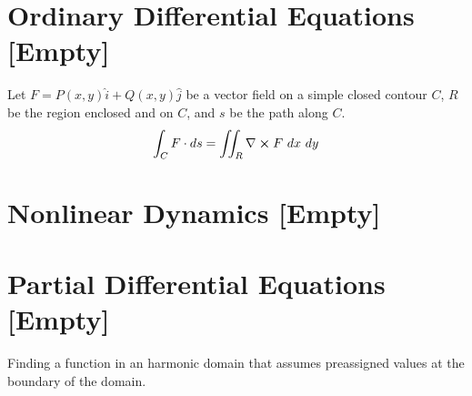 \documentclass[12pt, english]{book}
\begin{document}
	
	
	
	
	
	
	
	
	
	
	
	
	
	
	
	
	
	
	
	
	
	
	
	
	
	
	
	
	
	
	
	
	
	
	
	
	
	
	
	
	
	
	
	
	
	
	
	
	
	
	\part{Ordinary Differential Equations [Empty]} \label{Ordinary Differential Equations Part}
	
	\begin{theorem}
		\label{Green's Theorem - ODE}
		Let \(F = P(x,y) \hat{i} + Q(x,y) \hat{j}\) be a vector field on a simple closed contour \(C\), \(R\) be the region enclosed and on \(C\), and \(s\) be the path along \(C\).
		\begin{align*}
			\int_C F \cdot ds = \iint_R \nabla \cross F \ dx \ dy
		\end{align*}
	\end{theorem}
	
	\part{Nonlinear Dynamics [Empty]} \label{Nonlinear Dynamics Part}
	
	
	\part{Partial Differential Equations [Empty]} \label{Partial Differential Equations Part}
	
	\begin{definition}
		\label{Dirichlet Problem Definition - Partial}
		Finding a function in an harmonic domain that assumes preassigned values at the boundary of the domain.
	\end{definition}
	
\end{document}
